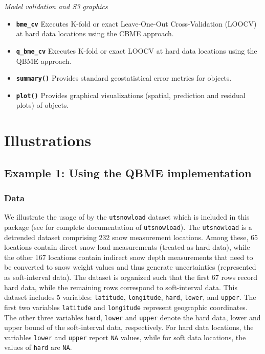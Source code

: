 \emph{Model validation and S3 graphics}

\begin{itemize}
\tightlist
\item
  \textbf{\texttt{bme\_cv}}
  Executes K-fold or exact Leave-One-Out Cross-Validation (LOOCV) at hard data locations using the CBME approach.
\item
  \textbf{\texttt{q\_bme\_cv}}
  Executes K-fold or exact LOOCV at hard data locations using the QBME approach.
\item
  \textbf{\texttt{summary()}}
  Provides standard geostatistical error metrics for  objects.
\item
  \textbf{\texttt{plot()}}
  Provides graphical visualizations (spatial, prediction and residual plots) of  objects.
\end{itemize}

\section{Illustrations}\label{illustrations}

\subsection{Example 1: Using the QBME implementation}\label{example-1-using-the-qbme-implementation}

\subsubsection{Data}\label{data}

We illustrate the usage of  by the \texttt{utsnowload} dataset which is included in this package (see \citet{duah2025integrating} for complete documentation of \texttt{utsnowload}). The \texttt{utsnowload} is a detrended dataset comprising 232 snow measurement locations. Among these, 65 locations contain direct snow load measurements (treated as hard data), while the other 167 locations contain indirect snow depth measurements that need to be converted to snow weight values and thus generate uncertainties (represented as soft-interval data). The dataset is organized such that the first 67 rows record hard data, while the remaining rows correspond to soft-interval data. This dataset includes 5 variables: \texttt{latitude}, \texttt{longitude}, \texttt{hard}, \texttt{lower}, and \texttt{upper}. The first two variables \texttt{latitude} and \texttt{longitude} represent geographic coordinates. The other three variables \texttt{hard}, \texttt{lower} and \texttt{upper} denote the hard data, lower and upper bound of the soft-interval data, respectively. For hard data locations, the variables \texttt{lower} and \texttt{upper} report \texttt{NA} values, while for soft data locations, the values of \texttt{hard} are \texttt{NA}.

